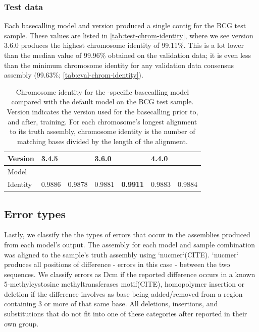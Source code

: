 \subsubsection{Test data}

Each basecalling model and version produced a single contig for the BCG test sample. These values are listed in \autoref{tab:test-chrom-identity}, where we see \tubby{} version 3.6.0 produces the highest chromosome identity of 99.11\%. This is a lot lower than the median value of 99.96\% obtained on the validation data; it is even less than the minimum chromosome identity for any validation data consensus assembly (99.63\%; \autoref{tab:eval-chrom-identity}).

\begin{table}
\centering
\begin{tabular}{@{}lllllll@{}}
\toprule
Version  & \multicolumn{2}{l}{3.4.5} & \multicolumn{2}{l}{3.6.0} & \multicolumn{2}{l}{4.4.0} \\ \midrule
Model    & \guppy{}       & \tubby{}       & \guppy{}        & \tubby{}       & \guppy{}        & \tubby{}       \\
Identity & 0.9886      & 0.9878      & 0.9881      & \textbf{0.9911}      & 0.9883      & 0.9884      \\ \bottomrule
\end{tabular}
\caption{Chromosome identity for the \mtb{}-specific basecalling model \tubby{} compared with the default \guppy{} model on the BCG test sample. Version indicates the \guppy{} version used for the basecalling prior to, and after, training. For each chromosome's longest alignment to its truth assembly, chromosome identity is the number of matching bases divided by the length of the alignment.}
\label{tab:test-chrom-identity}
\end{table}

\subsection{Error types}
\label{sec:tubby-error-types}

Lastly, we classify the the types of errors that occur in the assemblies produced from each model's output. The  assembly for each model and sample combination was aligned to the sample's truth assembly using `nucmer`(CITE). `nucmer` produces all positions of difference - errors in this case - between the two sequences. We classify errors as Dcm if the reported difference occurs in a known 5-methylcystosine methyltransferases motif(CITE), homopolymer insertion or deletion if the difference involves as base being added/removed from a region containing 3 or more of that same base. All deletions, insertions, and substitutions that do not fit into one of these categories after reported in their own group.

